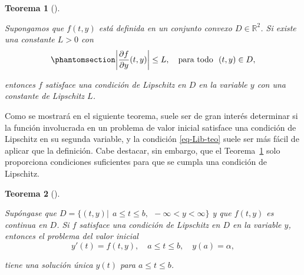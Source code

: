 \documentclass[
  spanish,
  us-letterpaper,
  DIV=11,
  numbers=noendperiod]{scrreprt}
\theoremstyle{plain}
\newtheorem{theorem}{Teorema}[chapter]
\theoremstyle{definition}
\theoremstyle{remark}
\begin{document}
\begin{theorem}[]\protect\hypertarget{thm-Lib-teo}{}\label{thm-Lib-teo}

Supongamos que \(f(t, y)\) está definida en un conjunto convexo
\(D \in \mathbb{R}^2\). Si existe una constante \(L > 0\) con
\begin{equation}\phantomsection\label{eq-Lib-teo}{
\left|\dfrac{\partial f}{\partial y}(t,y) \right| \leq L, \quad \text{para todo} \ \ (t,y)\in D,
}\end{equation}

entonces \(f\) satisface una condición de Lipschitz en \(D\) en la
variable \(y\) con una constante de Lipschitz \(L\).

\end{theorem}

Como se mostrará en el siguiente teorema, suele ser de gran interés
determinar si la función involucrada en un problema de valor inicial
satisface una condición de Lipschitz en su segunda variable, y la
condición \ref{eq-Lib-teo} suele ser más fácil de aplicar que la
definición. Cabe destacar, sin embargo, que el Teorema~\ref{thm-Lib-teo}
solo proporciona condiciones suficientes para que se cumpla una
condición de Lipschitz.

\begin{theorem}[]\protect\hypertarget{thm-uniq-sol}{}\label{thm-uniq-sol}

Supóngase que
\(D = \{(t, y) | \ \ a \leq t \leq b, \ \  -\infty < y < \infty \}\) y
que \(f (t, y)\) es continua en \(D\). Si \(f\) satisface una condición
de Lipschitz en \(D\) en la variable \(y\), entonces el problema del
valor inicial \[
y'(t)= f(t,y), \quad a\leq t \leq b, \quad y(a) = \alpha,
\]

tiene una solución única \(y(t)\) para \(a\leq t \leq b\).

\end{theorem}
\end{document}
